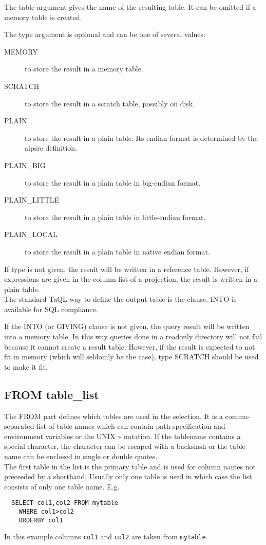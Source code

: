 The table argument gives the name of the resulting table. It can be
omitted if a memory table is created.

The type argument is optional and can be one of several values:
\begin{description}
  \item[MEMORY ]to store the result in a memory table.
  \item[SCRATCH ]to store the result in a scratch table, possibly on disk.
  \item[PLAIN ]to store the result in a plain table. Its endian format
is determined by the aipsrc definition.
  \item[PLAIN\_BIG ]to store the result in a plain table in big-endian format.
  \item[PLAIN\_LITTLE ]to store the result in a plain table in little-endian format.
  \item[PLAIN\_LOCAL ]to store the result in a plain table in native endian format.
\end{description}
If type is not given, the result will be written in a reference table.
However, if expressions are given in the column list of a projection,
the result is written in a plain table.
\\The standard TaQL way to define the output table is the
 clause. INTO is available
for SQL compliance.

If the INTO (or GIVING) clause is not given, the query result will be
written into a memory table. In this way queries done in a readonly
directory will not fail because it cannot create a result
table. However, if the result is expected to not fit in memory (which
will seldomly be the case), type SCRATCH should be used to make it fit.


\subsection{\label{TAQL:TABLE_LIST}FROM table\_list}
The FROM part defines which tables are used in the selection.
It is a comma-separated list of table names which can contain
path specification and environment variables or the UNIX
\verb+~+ notation. If the tablename contains a special character, the
character can be escaped with a backslash or the table name can be
enclosed in single or double quotes.
\\The first table in the list is the primary
table and is used for column names not preceeded by a shorthand.
Usually only one table is used in which case the list consists
of only one table name. E.g.
\begin{verbatim}
  SELECT col1,col2 FROM mytable
    WHERE col1>col2
    ORDERBY col1
\end{verbatim}
In this example columns \texttt{col1} and \texttt{col2}
are taken from \texttt{mytable}.

